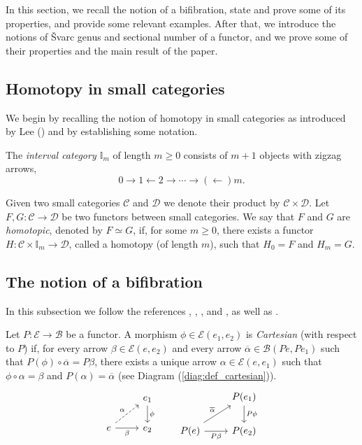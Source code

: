 \documentclass[12pt,reqno]{amsart}
\theoremstyle{definition}
\newtheorem{defi}[teo]{Definition}
\theoremstyle{remark}
\numberwithin{figure}{section}%
\newcommand{\Ba}{\mathcal{B}}
\newcommand{\bbar}{\overline}
\newcommand{\CC}{\mathcal{C}}
\newcommand{\D}{\mathcal{D}}
\newcommand{\Dc}{\mathcal{D}}
\newcommand{\E}{\mathcal{E}}
\begin{document}
In this section, we recall the notion of a bifibration, state and prove some of its properties, and provide some relevant examples. After that, we introduce the notions of \v{S}varc genus and sectional number of a functor, and we prove  some of their properties and the main result of the paper.


\subsection{Homotopy in small categories} We begin by recalling the notion of homotopy in small categories as introduced by Lee (\cite{LEE,LEE2}) and by establishing some notation. 

The {\em interval category $\mathbb{I}_m$} of length $m\geq 0$ consists of $m+1$ objects with zigzag arrows,
	 $$0 \longrightarrow 1 \longleftarrow 2 \longrightarrow \cdots \longrightarrow (\longleftarrow) m.$$

Given two small categories $\CC$ and $\Dc$ we denote their product by $\CC \times \D$. %
	Let $F,G\colon \CC\to \Dc$ be two functors between small categories. We say that $F$  and $G$ are {\em homotopic}, denoted by $F \simeq G$,  if, for some $m\geq 0$, there exists a functor $H\colon \CC \times \mathbb{I}_m \rightarrow \D$, called a homotopy (of length $m$), such that $H_0=F$ and $H_m=G$. 



\subsection{The notion of a bifibration}
In this subsection we follow the references  \cite{DAZIN}, \cite[Appendix A]{KOEN}, \cite{STREITCHER}, \cite{VISTOLI} and \cite[Chapter 12]{PENNER}, as well as \cite[Section 4]{TANAKA}. 

Let $P\colon \E \to \Ba$ be a functor.
A morphism $\phi\in \E(e_1,e_2)$ is {\em Cartesian} (with respect to $P$) if, for every arrow $\beta \in\E(e,e_2)$ and  every arrow
 $\bbar\alpha\in\Ba(Pe,Pe_1)$  such that $P(\phi)\circ \bbar\alpha=P\beta$,
there exists a unique arrow $\alpha\in\E(e,e_1)$ such that 
$\phi\circ\alpha=\beta$ and 
$P(\alpha)=\bbar\alpha$ (see Diagram (\ref{diag:def_cartesian})).
%
\begin{equation}\label{diag:def_cartesian}
\begin{tikzcd}%
& e_1 \ar{d}{\phi} \\
 e \arrow[ur,dashrightarrow,"\alpha"]\arrow[r,"\beta"'] & e_2 
\end{tikzcd}
\quad \quad
 \begin{tikzcd}%
& P(e_1) \arrow[d,"P\phi"] \\
P(e)\arrow[ur,"{\bbar\alpha}"]\arrow[r,"P\beta"'] & P(e_2)
\end{tikzcd}
\end{equation}
\end{document}
